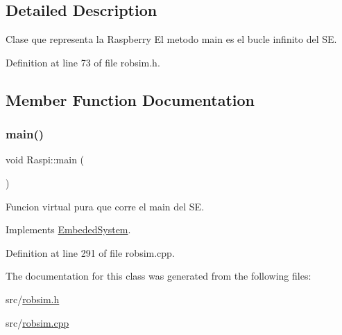 \subsection{Detailed Description}
Clase que representa la Raspberry El metodo main es el bucle infinito del SE. 

Definition at line 73 of file robsim.\+h.



\subsection{Member Function Documentation}
\mbox{\label{classRaspi_adce86197732891370a63b239cc413c7e}} 
\subsubsection{\texorpdfstring{main()}{main()}}
{\footnotesize\ttfamily void Raspi\+::main (\begin{DoxyParamCaption}{ }\end{DoxyParamCaption})\hspace{0.3cm}{\ttfamily [virtual]}}



Funcion virtual pura que corre el main del SE. 



Implements \hyperlink{classEmbededSystem_a3a333d4954af4068f5e97301b4f55c48}{Embeded\+System}.



Definition at line 291 of file robsim.\+cpp.



The documentation for this class was generated from the following files\+:\begin{DoxyCompactItemize}
\item 
src/\hyperlink{robsim_8h}{robsim.\+h}\item 
src/\hyperlink{robsim_8cpp}{robsim.\+cpp}\end{DoxyCompactItemize}
